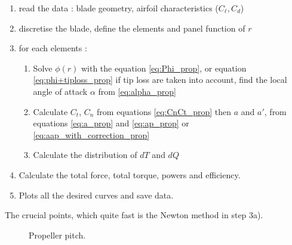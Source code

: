 \begin{enumerate}
\item read the data : blade geometry, airfoil characteristics ($C_\ell, C_d$)
\item discretise the blade, define the elements and panel function of  $r$ 
\item for each elements :
      \begin{enumerate}
      \item Solve $\phi(r)$ with the equation \eqref{eq:Phi_prop}, or equation \eqref{eq:phi+tiploss_prop}
      if tip loss are taken into account,
      find the local angle of attack $\alpha$ from \eqref{eq:alpha_prop}
      \item Calculate $C_t$, $C_n$  from equations \eqref{eq:CnCt_prop} then $a$ and $a'$, from equations 
      \eqref{eq:a_prop} and \eqref{eq:ap_prop}  or  \eqref{eq:aap_with_correction_prop}
      \item Calculate the distribution of $dT$ and $dQ$
      \end{enumerate}
\item Calculate the total force, total torque, powers and efficiency.
\item Plots all the desired curves and save data.
\end{enumerate}

The crucial points, which quite fast is the Newton method in step 3a).


% 

% 


\begin{figure}[htb]
  \begin{center}
  
  \caption{Propeller pitch.}
  \label{fig:pitch_propeller}
  \end{center}
\end{figure}


